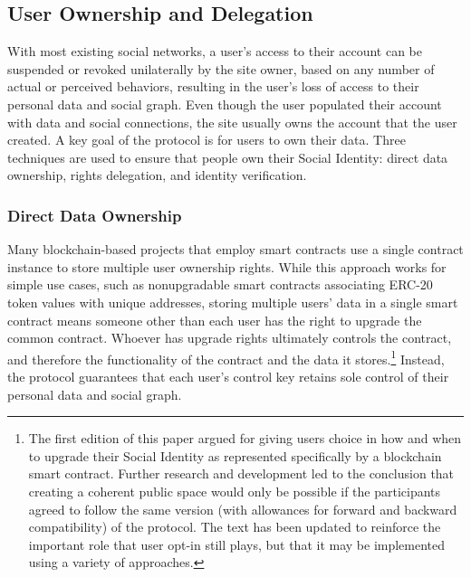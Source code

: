 \documentclass[12pt,letterpaper]{article}
\begin{document}
\subsection{User Ownership and Delegation}\label{sec:user_ownership and_delegation}

With most existing social networks, a user's access to their account can be suspended or
revoked unilaterally by the site owner, based on any number of actual or perceived
behaviors, resulting in the user's loss of access to their personal data and social graph.
Even though the user populated their account with data and social connections, the site
usually owns the account that the user created. A key goal of the protocol is for users to
own their data. Three techniques are used to ensure that people own their Social Identity:
direct data ownership, rights delegation, and identity verification.

\subsubsection{Direct Data Ownership}

Many blockchain-based projects that employ smart contracts use a single contract instance to
store multiple user ownership rights. While this approach works for simple use cases, such
as nonupgradable smart contracts associating ERC-20\cite{erc20} token values with unique
addresses, storing multiple users' data in a single smart contract means someone other than
each user has the right to upgrade the common contract. Whoever has upgrade rights
ultimately controls the contract, and therefore the functionality of the contract and the
data it stores.\footnote{The first edition of this paper argued for giving users choice in
  how and when to upgrade their Social Identity as represented specifically by a blockchain
  smart contract. Further research and development led to the conclusion that creating a
  coherent public space would only be possible if the participants agreed to follow the same
  version (with allowances for forward and backward compatibility) of the protocol. The text
  has been updated to reinforce the important role that user opt-in still plays, but that it
  may be implemented using a variety of approaches.} Instead, the protocol guarantees that
each user's control key retains sole control of their personal data and social graph.
\end{document}

